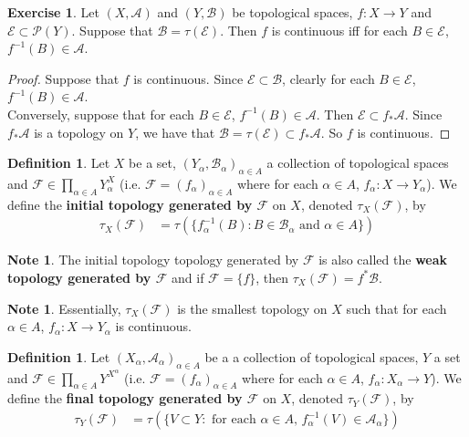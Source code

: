 \documentclass[12pt]{amsart}
\theoremstyle{definition}
\newtheorem{defn}[definition]{Definition}
\newtheorem{note}[definition]{Note}
\newtheorem{ex}[definition]{Exercise}
\newcommand{\al}{\alpha}
\newcommand{\MA}{\mathcal{A}}
\newcommand{\MB}{\mathcal{B}}
\newcommand{\MF}{\mathcal{F}}
\newcommand{\MP}{\mathcal{P}}
\newcommand{\ME}{\mathcal{E}}
\newcommand{\lex}[1]{\label{ex:#1}}
\newcommand{\ld}[1]{\label{defn:#1}}
\begin{document}
	\begin{ex} \lex{}
	Let $(X,\MA)$ and $(Y,\MB)$ be topological spaces, $f:X \rightarrow Y$ and $\ME \subset \MP(Y)$. Suppose that $\MB = \tau(\ME)$. Then $f$ is continuous iff for each $B \in \ME$, $f^{-1}(B) \in \MA$.
	\end{ex}
	
	\begin{proof}
	Suppose that $f$ is continuous. Since $\ME \subset \MB$, clearly for each $B \in \ME$, $f^{-1}(B) \in \MA$. \\
	Conversely, suppose that for each $B \in \ME$, $f^{-1}(B) \in \MA$. Then $\ME \subset f_*\MA$. Since $f_*\MA$ is a topology on $Y$, we have that $\MB = \tau(\ME) \subset f_*\MA$. So $f$ is continuous.
	\end{proof}
	
	\begin{defn} \ld{}
	Let $X$ be a set, $(Y_{\al}, \MB_{\al})_{\al \in A}$ a collection of topological spaces and $\MF \in \prod \limits_{\al \in A}Y_{\al}^X$ (i.e. $\MF = (f_{\al})_{\al \in A}$ where for each $\al \in A$, $f_{\al}:X \rightarrow Y_{\al}$). We define the \textbf{initial topology generated by $\MF$} on $X$, denoted $\tau_X(\MF)$, by 
	\begin{align*}
	\tau_X(\MF) 
	&= \tau(\{f_{\al}^{-1}(B): B \in \MB_{\al} \text{ and } \al \in A \})
\end{align*}	 
	\end{defn}
	
	\begin{note}
	The initial topology topology generated by $\MF$ is also called the \textbf{weak topology generated by $\MF$} and if $\MF = \{f\}$, then $\tau_X(\MF) = f^*\MB$.
	\end{note}
	
	\begin{note}
	Essentially, $\tau_X(\MF)$ is the smallest topology on $X$ such that for each $\al \in A$, $f_{\al}:X \rightarrow Y_{\al}$ is continuous. 
	\end{note}
	
	\begin{defn} \ld{}
	Let $(X_{\al}, \MA_{\al})_{\al \in A}$ be a a collection of topological spaces, $Y$ a set and $\MF \in \prod \limits_{\al \in A}Y^{X^{\al}}$ (i.e. $\MF = (f_{\al})_{\al \in A}$ where for each $\al \in A$, $f_{\al}:X_{\al} \rightarrow Y$). We define the \textbf{final topology generated by $\MF$} on $X$, denoted $\tau_Y(\MF)$, by 
	\begin{align*}
	\tau_Y(\MF) 
	&= \tau(\{V \subset Y: \text{ for each $\al \in A$, $f_{\al}^{-1}(V) \in \MA_{\al}$}\})
\end{align*}	 
	\end{defn}
	
\end{document}
